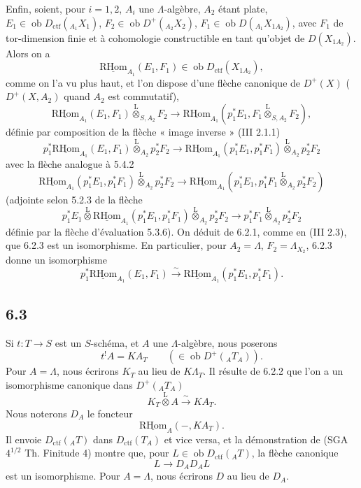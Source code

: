 \documentclass[11pt]{article}
\newcommand{\R}{\mathrm{R}}\newcommand{\RHomCore}{\mathrm{RHom}}
\providecommand{\RHom}{\RHomCore}
\providecommand{\uRHom}{\underline{\RHom}}
\providecommand{\lten}{\overset{\mathrm L}{\otimes}}
\providecommand{\Ob}{\operatorname{ob}}
\providecommand{\RHom}{\RHomCore}
\providecommand{\lten}{\overset{\mathrm L}{\otimes}}
\providecommand{\RHom}{\R\mathcal{H}om}
\providecommand{\lten}{\overset{\mathrm L}{\otimes}}
\providecommand{\Ob}{\operatorname{ob}}
\providecommand{\R}{\mathrm R}
\providecommand{\lten}{\overset{\mathrm L}{\otimes}}
\providecommand{\lten}{\overset{\mathrm L}{\otimes}}
\providecommand{\Ob}{\operatorname{Ob}}
\providecommand{\lten}{\overset{\mathrm L}{\otimes}}
\providecommand{\RHom}{\RHomCore}
\providecommand{\Ob}{\operatorname{ob}}
\providecommand{\Ob}{\operatorname{Ob}}
\providecommand{\lten}{\overset{\mathrm L}{\otimes}}
\begin{document}
Enfin, soient, pour $i=1,2$, $A_i$ une $\Lambda$-algèbre, $A_2$ étant plate, $E_1\in\Ob D_{\mathrm{ctf}}({}_{A_1}X_1)$, $F_2\in\Ob D^+({}_{A_2}X_2)$, $F_1\in\Ob D({}_{A_1}X_{1A_2})$, avec $F_1$ de tor-dimension finie et à cohomologie constructible en tant qu'objet de $D(X_{1A_2})$. Alors on a
\[
\uRHom_{A_1}(E_1,F_1)\in\Ob D_{\mathrm{ctf}}(X_{1A_2}),
\]
comme on l'a vu plus haut, et l'on dispose d'une flèche canonique de $D^+(X)$ ($D^+(X,A_2)$ quand $A_2$ est commutatif),
\begin{equation}
\uRHom_{A_1}(E_1,F_1)\lten_{S,A_2}F_2
\longrightarrow
\uRHom_{A_1}(p_1^*E_1,F_1\lten_{S,A_2}F_2),
\tag{6.2.3}
\end{equation}
définie par composition de la flèche « image inverse » (III 2.1.1)
\[
p_1^*\uRHom_{A_1}(E_1,F_1)\lten_{A_2}p_2^*F_2
\longrightarrow
\uRHom_{A_1}(p_1^*E_1,p_1^*F_1)\lten_{A_2}p_2^*F_2
\]
avec la flèche analogue à 5.4.2
\[
\uRHom_{A_1}(p_1^*E_1,p_1^*F_1)\lten_{A_2}p_2^*F_2
\longrightarrow
\uRHom_{A_1}(p_1^*E_1,p_1^*F_1\lten_{A_2}p_2^*F_2)
\]
(adjointe selon 5.2.3 de la flèche
\[
p_1^*E_1\lten\uRHom_{A_1}(p_1^*E_1,p_1^*F_1)\lten_{A_2}p_2^*F_2
\longrightarrow
p_1^*F_1\lten_{A_2}p_2^*F_2
\]
définie par la flèche d'évaluation 5.3.6). On déduit de 6.2.1, comme en (III 2.3), que 6.2.3 est un isomorphisme. En particulier, pour $A_2=\Lambda$, $F_2=\Lambda_{X_2}$, 6.2.3 donne un isomorphisme
\begin{equation}
p_1^*\uRHom_{A_1}(E_1,F_1)
\xrightarrow{\sim}
\uRHom_{A_1}(p_1^*E_1,p_1^*F_1).
\tag{6.2.4}
\end{equation}

\subsection*{6.3}
Si $t:T\to S$ est un $S$-schéma, et $A$ une $\Lambda$-algèbre, nous poserons
\begin{equation}
t^!A = KA_T \qquad(\in\Ob D^+({}_AT_A)).
\tag{6.3.1}
\end{equation}
Pour $A=\Lambda$, nous écrirons $K_T$ au lieu de $K\Lambda_T$. Il résulte de 6.2.2 que l'on a un isomorphisme canonique dans $D^+({}_AT_A)$
\begin{equation}
K_T\lten A\xrightarrow{\sim}KA_T.
\tag{6.3.2}
\end{equation}
Nous noterons $D_A$ le foncteur
\[
\uRHom_A(-,KA_T).
\]
Il envoie $D_{\mathrm{ctf}}({}_AT)$ dans $D_{\mathrm{ctf}}(T_A)$ et vice versa, et la démonstration de (SGA $4^{1/2}$ Th. Finitude 4) montre que, pour $L\in\Ob D_{\mathrm{ctf}}({}_AT)$, la flèche canonique
\[
L\longrightarrow D_AD_AL
\]
est un isomorphisme. Pour $A=\Lambda$, nous écrirons $D$ au lieu de $D_A$.
\end{document}

